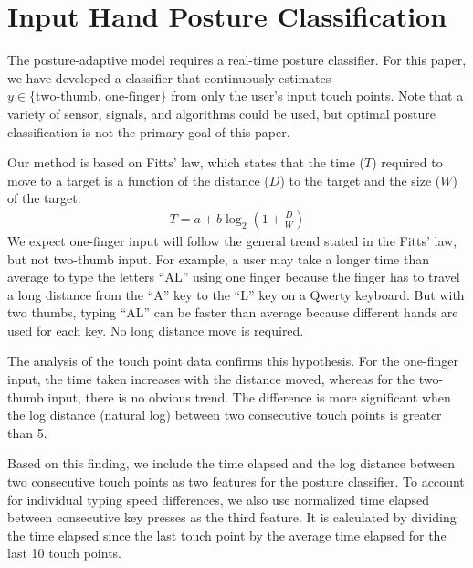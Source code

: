 \documentclass{sigchi}
\begin{document}
\section{Input Hand Posture Classification}\label{sec:posture-classification}
The posture-adaptive model requires a real-time posture classifier.  For this paper, we have developed a classifier that continuously estimates $y \in \{\text{two-thumb, one-finger}\}$ from only the user's input touch points.  Note that a variety of sensor, signals, and algorithms could be used, but optimal posture classification is not the primary goal of this paper.

Our method is based on Fitts' law, which states that the time ($T$) required to 
move to a target is a function of the distance ($D$) to the target and the size ($W$) of the target:
\begin{align}
T = a + b\log_2(1 + \frac{D}{W})
\end{align}                                                  
We expect one-finger input will follow the general trend stated in the Fitts' law, but not two-thumb input. For example, a user may take a longer time than average to type the letters ``AL'' using one
finger because the finger has to travel a long distance from the ``A'' key to the ``L'' key on
a Qwerty keyboard. But with two thumbs, typing ``AL'' can be faster than average because different hands are used for each key.  No long distance move is required. 

% 

The analysis of the touch point data confirms this hypothesis. For the 
one-finger input, the time taken increases with the distance
moved, whereas for the two-thumb input, there is no obvious trend. The
difference is more significant when the log distance (natural log)
between two consecutive touch points is greater than 5.

Based on this finding, we include the time elapsed and the log distance
between two consecutive touch points as two features for the posture classifier. 
To account for individual typing speed differences, we also use normalized time 
elapsed between consecutive key presses as the third feature. It is calculated 
by dividing the time elapsed since the last touch point by the average time elapsed for the last 10 touch points.
\end{document}
